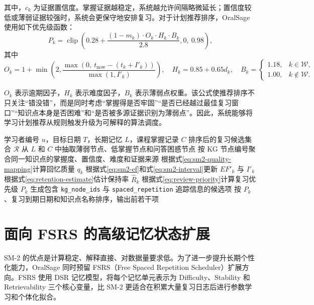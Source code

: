 其中，$c_k$ 为证据置信度。掌握证据越稳定，系统越允许间隔略微延长；置信度较低或薄弱证据较强时，系统会更保守地安排复习。对于计划推荐排序，OralSage 使用如下优先级函数：
\begin{equation}
  P_k=\operatorname{clip}\left(
  0.28+
  \frac{(1-m_k)\cdot O_k\cdot H_k\cdot B_k}{2.8},
  0,\ 0.98
  \right),
  \label{eq:review-priority}
\end{equation}
其中
\begin{equation}
  O_k=1+\min\left(2,\frac{\max(0,\ t_{\mathrm{now}}-(t_k+I'_k))}{\max(1,I'_k)}\right),
  \quad
  H_k=0.85+0.65d_k,
  \quad
  B_k =
  \begin{cases}
  1.18, & k\in \mathcal{W},\\
  1.00, & k\notin \mathcal{W}.
  \end{cases}
\end{equation}

$O_k$ 表示逾期因子，$H_k$ 表示难度因子，$B_k$ 表示薄弱点权重。该公式使推荐排序不只关注“错没错”，而是同时考虑“掌握得是否牢固”“是否已经越过最佳复习窗口”“知识点本身是否困难”和“是否被多源证据识别为薄弱点”。因此，系统能够将学习计划推荐从规则触发升级为可解释的算法调度。

\begin{algorithm}[H]
  \caption{面向 KG 节点的 SM-2 复习调度}
  \label{alg:kg-sm2-review}
  \begin{algorithmic}[1]
    \Require 学习者编号 $u$，目标日期 $T$，长期记忆 $L$，课程掌握记录 $C$
    \Ensure 排序后的复习候选集合 $\mathcal{R}$
    \State 从 $L$ 和 $C$ 中抽取薄弱节点、低掌握节点和问答困惑节点
    \State 按 KG 节点编号聚合同一知识点的掌握度、置信度、难度和证据来源
      \State 根据式\eqref{eq:sm2-quality-mapping}计算回忆质量 $q_k$
      \State 根据式\eqref{eq:sm2-ef}和式\eqref{eq:sm2-interval}更新 $EF'_k$ 与 $I'_k$
      \State 根据式\eqref{eq:retention-estimate}估计保持率 $\hat R_k$
      \State 根据式\eqref{eq:review-priority}计算复习优先级 $P_k$
      \State 生成包含 \texttt{kg\_node\_ids} 与 \texttt{spaced\_repetition} 追踪信息的候选项
    \EndFor
    \State 按 $P_k$、复习到期日期和知识点名称排序，输出前若干项
  \end{algorithmic}
\end{algorithm}

\section{面向 FSRS 的高级记忆状态扩展}

SM-2 的优点是计算稳定、解释直接、对数据量要求低。为了进一步提升长期个性化能力，OralSage 同时预留 FSRS（Free Spaced Repetition Scheduler）扩展方向。FSRS 使用 DSR 记忆模型，将每个记忆单元表示为 Difficulty、Stability 和 Retrievability 三个核心变量\cite{openfsrs2025algorithm}，比 SM-2 更适合在积累大量复习日志后进行参数学习和个体化拟合。

